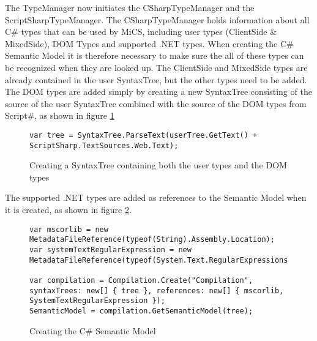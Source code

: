 The TypeManager now initiates the CSharpTypeManager and the ScriptSharpTypeManager. The CSharpTypeManager holds information about all C\# types that can be used by MiCS, including user types (ClientSide \& MixedSide), DOM Types and supported .NET types. When creating the C\# Semantic Model it is therefore necessary to make sure the all of these types can be recognized when they are looked up. The ClientSide and MixedSide types are already contained in the user SyntaxTree, but the other types need to be added. The DOM types are added simply by creating a new SyntaxTree consisting of the source of the user SyntaxTree combined with the source of the DOM types from Script\#, as shown in figure \ref{fig:init_mics_add_dom_types}

\begin{figure}[H]
\begin{lstlisting}[language=CSharp,classoffset=1,morekeywords={SyntaxTree}]
var tree = SyntaxTree.ParseText(userTree.GetText() + ScriptSharp.TextSources.Web.Text);
\end{lstlisting}
\caption{Creating a SyntaxTree containing both the user types and the DOM types}
\label{fig:init_mics_add_dom_types}
\end{figure}

The supported .NET types are added as references to the Semantic Model when it is created, as shown in figure \ref{fig:init_mics_create_semantic_model}.



\begin{figure}[H]
\begin{lstlisting}[language=CSharp,classoffset=1,morekeywords={MetadataFileReference,Regex,String,Compilation}]
var mscorlib = new MetadataFileReference(typeof(String).Assembly.Location);
var systemTextRegularExpression = new MetadataFileReference(typeof(System.Text.RegularExpressions.Regex).Assembly.Location);

var compilation = Compilation.Create("Compilation", syntaxTrees: new[] { tree }, references: new[] { mscorlib, SystemTextRegularExpression });
SemanticModel = compilation.GetSemanticModel(tree);
\end{lstlisting}
\caption{Creating the C\# Semantic Model}
\label{fig:init_mics_create_semantic_model}
\end{figure}

